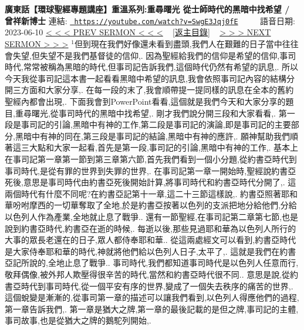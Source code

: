 \documentclass{book}
\begin{document}
\section{}
\label{sec:SwgE3Jqj0fE}
\textbf{廣東話【環球聖經專題講座】重溫系列:重尋曙光 從士師時代的黑暗中找希望 / 曾祥新博士}
\newline
\newline
連結: \href{https://youtube.com/watch?v=SwgE3Jqj0fE}{\texttt{ https://youtube.com/watch?v=SwgE3Jqj0fE}} ~~~~ 語音日期: 2023-06-10 
\newline
\newline
\hyperref[sec:vk40QVvJNlA]{\small{< < < PREV SERMON < < <}}
~
\hyperref[sec:index]{\small{[返主目錄]}}
~
\hyperref[sec:4SAfUFX37IQ]{\small{> > > NEXT SERMON > > >}}
\newline
\newline
$^{1}$但到現在我們好像還未看到盡頭,我們人在艱難的日子當中往往會失望,但失望不是我們基督徒的信仰,.
因為聖經給我們的信仰是希望的信仰,事司時代,常常被稱為黑暗的時代,但事司記告訴我們,這個時代仍然有希望的訊息,.
所以今天我從事司記這本書一起看看黑暗中希望的訊息,我會依照事司記內容的結構分開三方面和大家分享,.
在每一段的末了,我會順帶提一提同樣的訊息在全本的舊約聖經內都會出現,.
下面我會到PowerPoint看看,這個就是我們今天和大家分享的題目,重尋曙光,從事司時代的黑暗中找希望,.
剛才我們說分開三段和大家看看,.
第一段是事司記的引論,黑暗中有神的工作,第二段是事司記的演論,即是事司記的主要部分,黑暗中有神的同在,第三段是事司記的結論,黑暗中有神的應許,.
願神幫助我們順著這三大點和大家一起看,首先是第一段,事司記的引論,黑暗中有神的工作,.
基本上在事司記第一章第一節到第三章第六節,首先我們看到一個小分題,從約書亞時代到事司時代,是從有罪的世界到失罪的世界,.
在事司記第一章一開始時,聖經說約書亞死後,意思是事司時代由約書亞死後開始計算,將事司時代和約書亞時代分開了,.
這兩個時代有什麼不同呢?在約書亞記第十一章,這二十三節這樣說,.
約書亞照著耶和華吩咐摩西的一切華奪取了全地,於是約書亞按著以色列的支派把地分給他們,分給以色列人作為產業,全地就止息了戰爭..
還有一節聖經,在事司記第二章第七節,也是說到約書亞時代,約書亞在逝的時候,.
每逝以後,那些見過耶和華為以色列人所行的大事的眾長老還在的日子,眾人都侍奉耶和華..
從這兩處經文可以看到,約書亞時代是大家侍奉耶和華的時代,神就將他們給以色列人日子,太平了,.
這就是我們在約書亞記所說的,全地止息了戰爭..
事司時代,我們都知道事司時代是以色列人任意而行,敬拜偶像,被外邦人欺壓得很辛苦的時代,當然和約書亞時代很不同..
意思是說,從約書亞時代到事司時代,從一個平安有序的世界,變成了一個失去秩序的痛苦的世界,.
這個蛻變是漸漸的,從事司第一章的描述可以讓我們看到,以色列人得應他們的過程,第一章告訴我們,.
第一章是猶大之牌,第一章的最後記載的是但之牌,事司記的主體,事司故事,也是從猶大之牌的鵝駝列開始,.
\end{document}
